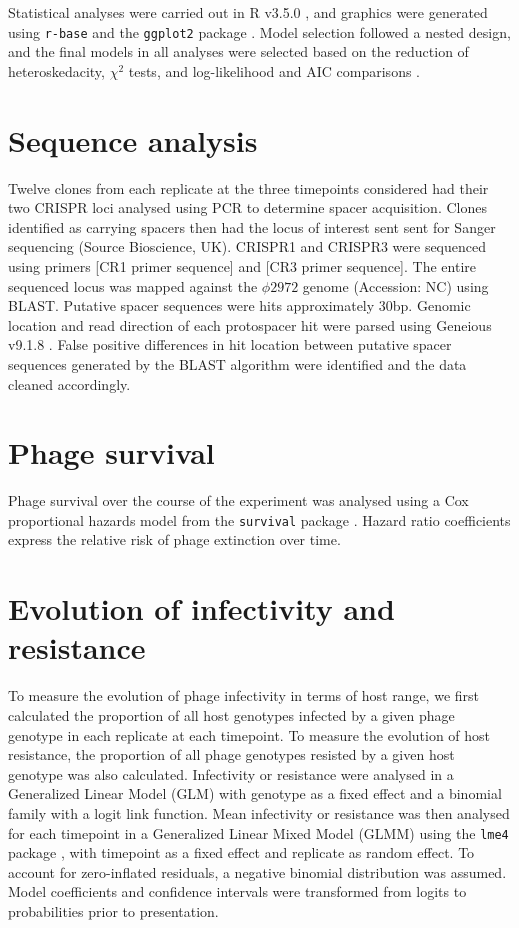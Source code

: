 \documentclass [12pt, a4paper, twoside]  {article}
\begin{document}
Statistical analyses were carried out in R v3.5.0 \citep{R}, and graphics were generated using \texttt{r-base} and the \texttt{ggplot2} package \citep{ggplot2}. Model selection followed a nested design, and the final models in all analyses were selected based on the reduction of heteroskedacity, $\chi ^2$ tests, and log-likelihood and AIC comparisons \citep{akaike1973,burnham2003model,burnham2004aic}.

\section*{Sequence analysis}
Twelve clones from each replicate at the three timepoints considered had their two CRISPR loci analysed using PCR to determine spacer acquisition. Clones identified as carrying spacers then had the locus of interest sent sent for Sanger sequencing (Source Bioscience, UK). CRISPR1 and CRISPR3 were sequenced using primers [CR1 primer sequence] and [CR3 primer sequence]. The entire sequenced locus was mapped against the $\phi 2972$ genome (Accession: NC) using BLAST. Putative spacer sequences were hits approximately 30bp. Genomic location and read direction of each protospacer hit were parsed using Geneious v9.1.8 \citep{kearse2012geneious}. False positive differences in hit location between putative spacer sequences generated by the BLAST algorithm were identified and the data cleaned accordingly. 

\section*{Phage survival}
Phage survival over the course of the experiment was analysed using a Cox proportional hazards model from the \texttt{survival} package \citep{survival}. Hazard ratio coefficients express the relative risk of phage extinction over time. 

\section*{Evolution of infectivity and resistance}

To measure the evolution of phage infectivity in terms of host range, we first calculated the proportion of all host genotypes infected by a given phage genotype in each replicate at each timepoint. To measure the evolution of host resistance, the proportion of all phage genotypes resisted by a given host genotype was also calculated. Infectivity or resistance were analysed in a Generalized Linear Model (GLM) with genotype as a fixed effect and a binomial family with a logit link function. Mean infectivity or resistance was then analysed for each timepoint in a Generalized Linear Mixed Model (GLMM) using the \texttt{lme4} package \citep{lme4}, with timepoint as a fixed effect and replicate as random effect. To account for zero-inflated residuals, a negative binomial distribution was assumed. Model coefficients and confidence intervals were transformed from logits to probabilities prior to presentation. 
\end{document}
